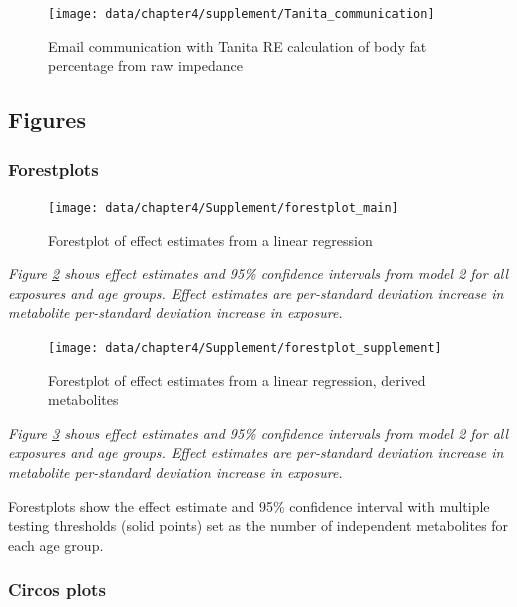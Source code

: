 \documentclass[11pt,twoside]{bristolthesis}
\newcommand{\blandscape}{\begin{landscape}}
\newcommand{\elandscape}{\end{landscape}}
\newcommand{\bsmall}{\begin{small}}
\newcommand{\esmall}{\end{small}}
\begin{document}
\begin{figure}
\texttt{[image: data/chapter4/supplement/Tanita\_communication]} \caption{Email communication with Tanita RE calculation of body fat percentage from raw impedance}\label{fig:appendix-chapter4-communications-tanita}
\end{figure}
\hypertarget{figures}{%
\subsection{Figures}\label{figures}}

\hypertarget{chapter4-appendix-figures-forestplots}{%
\subsubsection{Forestplots}\label{chapter4-appendix-figures-forestplots}}

\blandscape
\begin{figure}
\texttt{[image: data/chapter4/Supplement/forestplot\_main]} \caption{Forestplot of effect estimates from a linear regression}\label{fig:chapter4-appendix-figure-forestplot-main}
\end{figure}
\noindent 
\bsmall
\emph{Figure \ref{fig:chapter4-appendix-figure-forestplot-main} shows effect estimates and 95\% confidence intervals from model 2 for all exposures and age groups. Effect estimates are per-standard deviation increase in metabolite per-standard deviation increase in exposure.}
\esmall
\elandscape

\blandscape
\begin{figure}
\texttt{[image: data/chapter4/Supplement/forestplot\_supplement]} \caption{Forestplot of effect estimates from a linear regression, derived metabolites}\label{fig:chapter4-appendix-figure-forestplot-supplement}
\end{figure}
\noindent 
\bsmall
\emph{Figure \ref{fig:chapter4-appendix-figure-forestplot-supplement} shows effect estimates and 95\% confidence intervals from model 2 for all exposures and age groups. Effect estimates are per-standard deviation increase in metabolite per-standard deviation increase in exposure.}
\esmall
\elandscape

Forestplots show the effect estimate and 95\% confidence interval with multiple testing thresholds (solid points) set as the number of independent metabolites for each age group.

\hypertarget{circos-plots}{%
\subsubsection{Circos plots}\label{circos-plots}}
\end{document}
